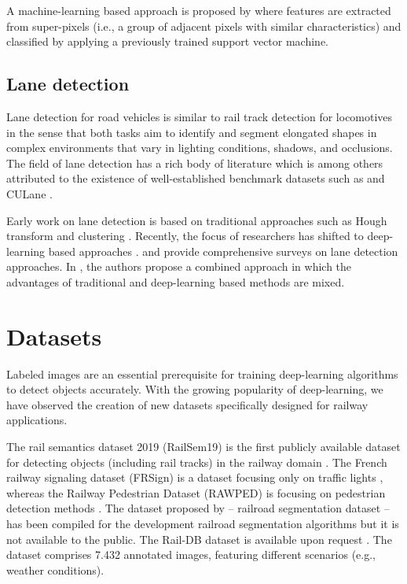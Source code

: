 \documentclass[Master,MDS,english]{BASE/twbook} %
\begin{document}
A machine-learning based approach is proposed by \citep{teng2016visual} where features are extracted from super-pixels (i.e., a group of adjacent pixels with similar characteristics) and classified by applying a previously trained support vector machine.


\section{Lane detection} \label{sec:lane_detection}

Lane detection for road vehicles is similar to rail track detection for locomotives in the sense that both tasks aim to identify and segment elongated shapes in complex environments that vary in lighting conditions, shadows, and occlusions. 
The field of lane detection has a rich body of literature which is among others attributed to the existence of well-established benchmark datasets such as \cite{TuSimple} and CULane \citep{pan2018SCNN}. 

Early work on lane detection is based on traditional approaches such as Hough transform and clustering \citep{10.1145/361237.361242, 5432669}. Recently, the focus of researchers has shifted to deep-learning based approaches \citep{meyer2021yolino, zheng2022clrnet, wang2022keypoint}.
\cite{tang2021review} and \cite{yang2023lane} provide comprehensive surveys on lane detection approaches. In \citep{yang2023lane}, the authors propose a combined approach in which the advantages of traditional and deep-learning based methods are mixed.


\chapter{Datasets} %

Labeled images are an essential prerequisite for training deep-learning algorithms to detect objects accurately.
With the growing popularity of deep-learning, we have observed the creation of new datasets specifically designed for railway applications.

The rail semantics dataset 2019 (RailSem19) is the first publicly available
dataset for detecting objects (including rail tracks) in the railway domain \citep{9025646}. 
The French railway signaling dataset (FRSign) is a dataset focusing only on traffic lights \citep{9025646}, whereas the Railway Pedestrian Dataset (RAWPED) is focusing on pedestrian detection methods \citep{9050835}. The dataset proposed by \cite{8859360} -- railroad segmentation dataset -- has been compiled for the development railroad segmentation algorithms but it is not available to the public. The Rail-DB dataset is available upon request \citep{10.1145/3503161.3548050}. The dataset comprises 7.432 annotated images, featuring different scenarios (e.g., weather conditions). 
\end{document}
